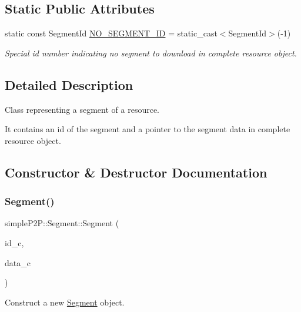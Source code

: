 \subsection*{Static Public Attributes}
\begin{DoxyCompactItemize}
\item 
\mbox{\label{classsimpleP2P_1_1Segment_ae40a3db5a0152fcc524944e7765176a5}} 
static const Segment\+Id \hyperlink{classsimpleP2P_1_1Segment_ae40a3db5a0152fcc524944e7765176a5}{N\+O\+\_\+\+S\+E\+G\+M\+E\+N\+T\+\_\+\+ID} = static\+\_\+cast$<$Segment\+Id$>$(-\/1)
\begin{DoxyCompactList}\small\item\em Special id number indicating no segment to download in complete resource object. \end{DoxyCompactList}\end{DoxyCompactItemize}


\subsection{Detailed Description}
Class representing a segment of a resource. 

It contains an id of the segment and a pointer to the segment data in complete resource object. 

\subsection{Constructor \& Destructor Documentation}
\mbox{\label{classsimpleP2P_1_1Segment_a35cd2a4c12538c14fca1943a2145b160}} 
\subsubsection{\texorpdfstring{Segment()}{Segment()}}
{\footnotesize\ttfamily simple\+P2\+P\+::\+Segment\+::\+Segment (\begin{DoxyParamCaption}\item[{Segment\+Id}]{id\+\_\+c,  }\item[{Uint8 $\ast$}]{data\+\_\+c }\end{DoxyParamCaption})}



Construct a new \hyperlink{classsimpleP2P_1_1Segment}{Segment} object. 


